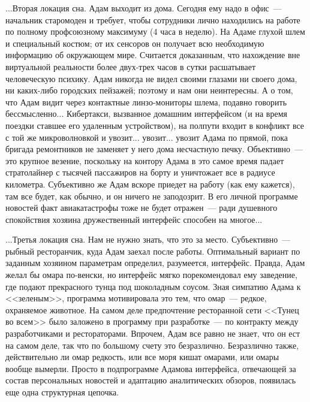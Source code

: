 \documentclass{scrbook}
\newcommand{\flqq}{<<}
\newcommand{\frqq}{>>}
\newcommand{\mdash}{~--- }
\begin{document}
...Вторая локация сна. Адам выходит из дома. Сегодня ему надо в офис{\mdash}начальник старомоден и требует, чтобы сотрудники лично находились на работе по полному профсоюзному максимуму (4 часа в неделю). На Адаме глухой шлем и специальный костюм; от их сенсоров он получает всю необходимую информацию об окружающем мире. Считается доказанным, что нахождение вне виртуальной реальности более двух-трех часов в сутки расшатывает человеческую психику. Адам никогда не видел своими глазами ни своего дома, ни каких-либо городских пейзажей; поэтому и нам они неинтересны. А о том, что Адам видит через контактные линзо-мониторы шлема, подавно говорить бессмысленно... Кибертакси, вызванное домашним интерфейсом (и на время поездки ставшее его удаленным устройством), на полпути входит в конфликт все с той же микроволновкой и увозит... увозит... увозит Адама по прямой, пока бригада ремонтников не заменяет у него дома несчастную печку. Объективно{\mdash}это крупное везение, поскольку на контору Адама в это самое время падает стратолайнер с тысячей пассажиров на борту и уничтожает все в радиусе километра. Субъективно же Адам вскоре приедет на работу (как ему кажется), там все будет, как обычно, и он ничего не заподозрит. В его личной программе новостей факт авиакатастрофы тоже не будет отражен{\mdash}ради душевного спокойствия хозяина дружественный интерфейс способен на многое...

...Третья локация сна. Нам не нужно знать, что это за место. Субъективно{\mdash}рыбный ресторанчик, куда Адам заехал после работы. Оптимальный вариант по заданным хозяином параметрам определил, разумеется, интерфейс. Правда, Адам желал бы омара по-венски, но интерфейс мягко порекомендовал ему заведение, где подают прекрасного тунца под шоколадным соусом. Зная симпатию Адама к {\flqq}зеленым{\frqq}, программа мотивировала это тем, что омар{\mdash}редкое, охраняемое животное. На самом деле предпочтение ресторанной сети {\flqq}Тунец во всем{\frqq} было заложено в программу при разработке{\mdash}по контракту между разработчиками и рестораторами. Впрочем, Адам все равно не знает, что он ест на самом деле, так что по большому счету это безразлично. Безразлично также, действительно ли омар редкость, или все моря кишат омарами, или омары вообще вымерли. Просто в подпрограмме Адамова интерфейса, отвечающей за состав персональных новостей и адаптацию аналитических обзоров, появилась еще одна структурная цепочка.
\end{document}
